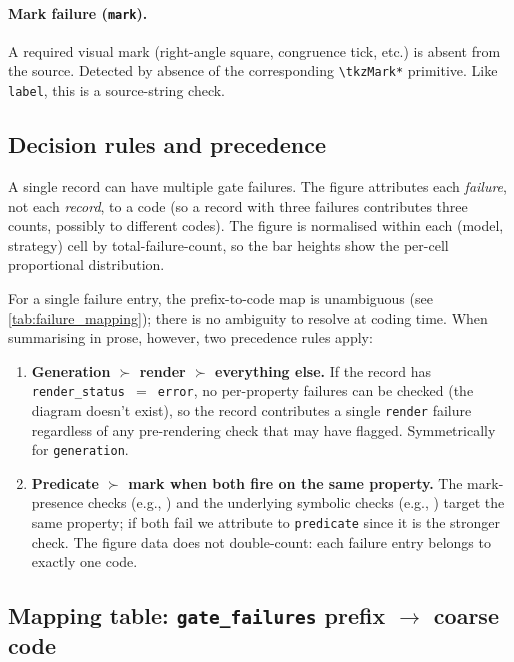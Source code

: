 \paragraph{\textbf{Mark failure} (\texttt{mark}).}
A required visual mark (right-angle square, congruence tick, etc.) is absent from the source.
Detected by absence of the corresponding \texttt{\textbackslash tkzMark*} primitive.
Like \texttt{label}, this is a source-string check.

\subsection{Decision rules and precedence}
\label{app:failure_coding:rules}

A single record can have multiple gate failures.
The figure attributes each \emph{failure}, not each \emph{record}, to a code (so a record with three failures contributes three counts, possibly to different codes).
The figure is normalised within each (model, strategy) cell by total-failure-count, so the bar heights show the per-cell proportional distribution.

For a single failure entry, the prefix-to-code map is unambiguous (see \cref{tab:failure_mapping}); there is no ambiguity to resolve at coding time.
When summarising in prose, however, two precedence rules apply:

\begin{enumerate}
\item \textbf{Generation $\succ$ render $\succ$ everything else.}
If the record has \texttt{render\_status\,$=$\,error}, no per-property failures can be checked (the diagram doesn't exist), so the record contributes a single \texttt{render} failure regardless of any pre-rendering check that may have flagged.
Symmetrically for \texttt{generation}.
\item \textbf{Predicate $\succ$ mark when both fire on the same property.}
The mark-presence checks (e.g., ) and the underlying symbolic checks (e.g., ) target the same property; if both fail we attribute to \texttt{predicate} since it is the stronger check.
The figure data does not double-count: each failure entry belongs to exactly one code.
\end{enumerate}

\subsection{Mapping table: \texttt{gate\_failures} prefix $\to$ coarse code}
\label{app:failure_coding:mapping}

